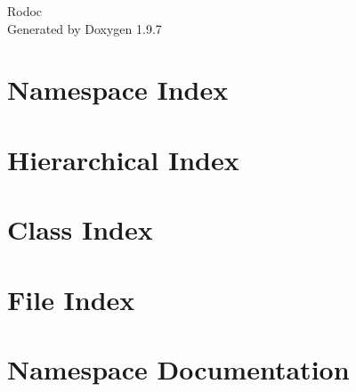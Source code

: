 \documentclass[twoside]{book}
\newcommand{\+}{\discretionary{\mbox{\scriptsize$\hookleftarrow$}}{}{}}
\newcommand{\clearemptydoublepage}{%
    \newpage{\pagestyle{empty}\cleardoublepage}%
  }
\begin{document}
  \raggedbottom
    \hypersetup{pageanchor=false,
                bookmarksnumbered=true,
                pdfencoding=unicode
               }
  \begin{titlepage}
  \vspace*{7cm}
  \begin{center}%
  {\Large Rodoc}\\
  \vspace*{1cm}
  {\large Generated by Doxygen 1.9.7}\\
  \end{center}
  \end{titlepage}
  \clearemptydoublepage
  \tableofcontents
  \clearemptydoublepage
  \hypersetup{pageanchor=true}








\chapter{Namespace Index}

\chapter{Hierarchical Index}

\chapter{Class Index}

\chapter{File Index}

\chapter{Namespace Documentation}













\end{document}
